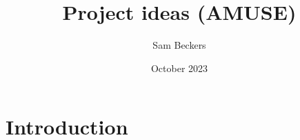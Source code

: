 \documentclass{article}
\title{Project ideas (AMUSE)}
\author{Sam Beckers}
\date{October 2023}
\begin{document}
\maketitle

\section{Introduction}
\end{document}
